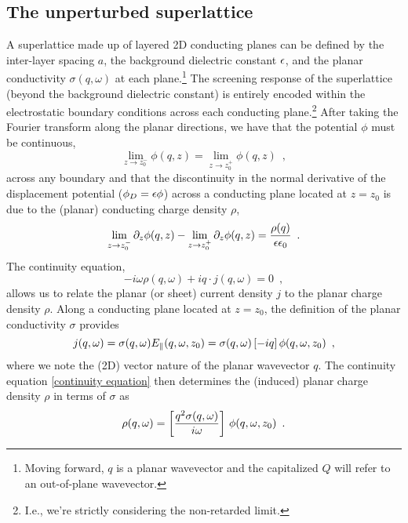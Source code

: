 \documentclass{article}
\begin{document}
\subsection{The unperturbed superlattice}

A superlattice made up of layered 2D conducting planes can be defined by the inter-layer spacing $a$, the background dielectric constant $\epsilon$, and the planar conductivity $\sigma(q,\omega)$ at each plane.\footnote{Moving forward, $q$ is a planar wavevector and the capitalized $Q$ will refer to an out-of-plane wavevector.}  The screening response of the superlattice (beyond the background dielectric constant) is entirely encoded within the electrostatic boundary conditions across each conducting plane.\footnote{I.e., we're strictly considering the non-retarded limit.}  After taking the Fourier transform along the planar directions, we have that the potential $\phi$ must be continuous,
\begin{equation}
    \label{phi continuity}
    \lim_{z\to z_0^-}\phi(q,z) = \lim_{z\to z_0^+}\phi(q,z)
    \,\,\,,
\end{equation}
across any boundary and that the discontinuity in the normal derivative of the displacement potential ($\phi_D = \epsilon\phi$) across a conducting plane located at $z=z_0$ is due to the (planar) conducting charge density $\rho$,
\begin{equation}
    \label{phi discontinuity expression}
    \lim_{z\to z_0^-}\partial_z\phi(q,z) - \lim_{z\to z_0^+}\partial_z\phi(q,z) = \frac{\rho(q)}{\epsilon\epsilon_0}
    \,\,\,.
\end{equation}
The continuity equation,
\begin{equation}
\label{continuity equation}
    -i\omega\rho(q,\omega) +iq\cdot j(q,\omega) = 0
    \,\,\,,
\end{equation}
allows us to relate the planar (or sheet) current density $j$ to the planar charge density $\rho$.  Along a conducting plane located at $z=z_0$, the definition of the planar conductivity $\sigma$ provides
\begin{equation}
    \label{conductivity def}
    j(q,\omega) = \sigma(q,\omega) E_\parallel(q,\omega,z_0) = \sigma(q,\omega) \left[ -i q\right]\phi(q,\omega,z_0)
    \,\,\,,
\end{equation}
where we note the (2D) vector nature of the planar wavevector $q$.  The continuity equation \eqref{continuity equation} then determines the (induced) planar charge density $\rho$ in terms of $\sigma$ as
\begin{equation}
\label{charge density conductivity relation}
\rho(q,\omega) =
\left[\frac{q^2\sigma(q,\omega)}{i\omega}\right]\,\phi(q,\omega,z_0)
\,\,\,.
\end{equation}
\end{document}
